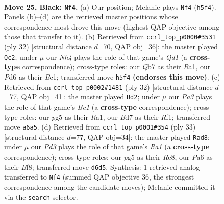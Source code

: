 \documentclass[11pt]{article}
\begin{document}
\clearpage

\begin{figure}[p]\centering
\begin{subfigure}{0.46\textwidth}\centering
\resizebox{\linewidth}{!}{%
\newchessgame
\chessboard[
  setfen={r6r/1q1b1kbp/p1npp1p1/1p2p1Pn/4P2P/2N2P2/PPPK1BQ1/R1R2B2 b - - 2 25},
  showmover=false,
  pgfstyle=straightmove, color=movearrow, markmove={h5-f4}
]}
\caption{}
\end{subfigure}\hfill
\begin{subfigure}{0.46\textwidth}\centering
\resizebox{\linewidth}{!}{%
\newchessgame
\chessboard[
  setfen={r3brk1/1p2b1pp/1q2pn2/p2pNp2/P2P4/4PPP1/1P4BP/R1BQ1RK1 w - - 1 17},
  showmover=false,
  pgfstyle=straightmove, color=movearrow, markmove={d1-c2}
]}
\caption{}
\end{subfigure}
\\[4pt]
\begin{subfigure}{0.46\textwidth}\centering
\resizebox{\linewidth}{!}{%
\newchessgame
\chessboard[
  setfen={r1bq1rk1/1p1n2pp/2pb4/p2p1pn1/P2P4/2NNPPP1/1PQ3BP/R1B2RK1 w - - 1 17},
  showmover=false,
  pgfstyle=straightmove, color=movearrow, markmove={c1-d2}
]}
\caption{}
\end{subfigure}\hfill
\begin{subfigure}{0.46\textwidth}\centering
\resizebox{\linewidth}{!}{%
\newchessgame
\chessboard[
  setfen={r3rbk1/pb1q1ppp/1pn1n3/2ppPN1P/8/3P1NP1/PP3PBK/R1BQR3 b - - 0 17},
  showmover=false,
  pgfstyle=straightmove, color=movearrow, markmove={a8-d8}
]}
\caption{}
\end{subfigure}
\caption{\textbf{Move 25, Black: \texttt{Nf4}.} (a) Our position; Melanie plays \texttt{Nf4} (\texttt{h5f4}). Panels (b)--(d) are the retrieved master positions whose correspondence most drove this move (highest QAP objective among those that transfer to it). (b) Retrieved from \texttt{ccrl\_top\_p0000\#3531} (ply 32) [structural distance $d$=70, QAP obj=36]: the master played \texttt{Qc2}; under $\mu$ our \emph{Nh4} plays the role of that game's \emph{Qd1} (a \textbf{cross-type} correspondence); cross-type roles: our \emph{Q}b7 as their \emph{R}a1, our \emph{P}d6 as their \emph{B}c1; transferred move \texttt{h5f4} \textbf{(endorses this move)}. (c) Retrieved from \texttt{ccrl\_top\_p0002\#1481} (ply 32) [structural distance $d$=77, QAP obj=41]: the master played \texttt{Bd2}; under $\mu$ our \emph{Pa3} plays the role of that game's \emph{Bc1} (a \textbf{cross-type} correspondence); cross-type roles: our \emph{p}g5 as their \emph{R}a1, our \emph{B}d7 as their \emph{R}f1; transferred move \texttt{a6a5}. (d) Retrieved from \texttt{ccrl\_top\_p0001\#354} (ply 33) [structural distance $d$=77, QAP obj=34]: the master played \texttt{Rad8}; under $\mu$ our \emph{Pd3} plays the role of that game's \emph{Ra1} (a \textbf{cross-type} correspondence); cross-type roles: our \emph{p}g5 as their \emph{R}e8, our \emph{P}a6 as their \emph{B}f8; transferred move \texttt{d6d5}. Synthesis: 1 retrieved analog transferred to \texttt{Nf4} (summed QAP objective 36, the strongest correspondence among the candidate moves); Melanie committed it via the \texttt{search} selector.}
\label{fig:thought-m49}
\end{figure}
\end{document}
